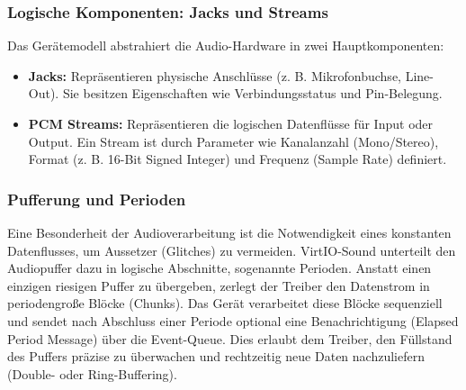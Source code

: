 \subsubsection{Logische Komponenten: Jacks und Streams}

Das Gerätemodell abstrahiert die Audio-Hardware in zwei Hauptkomponenten:

\begin{itemize}
 \item \textbf{Jacks:} Repräsentieren physische Anschlüsse (z. B. Mikrofonbuchse, Line-Out). Sie besitzen Eigenschaften wie Verbindungsstatus und Pin-Belegung.
 \item \textbf{PCM Streams:} Repräsentieren die logischen Datenflüsse für Input oder Output. Ein Stream ist durch Parameter wie Kanalanzahl (Mono/Stereo), Format (z. B. 16-Bit Signed Integer) und Frequenz (Sample Rate) definiert.
\end{itemize}

\subsubsection{Pufferung und Perioden}

Eine Besonderheit der Audioverarbeitung ist die Notwendigkeit eines konstanten Datenflusses, um Aussetzer (Glitches) zu vermeiden. VirtIO-Sound unterteilt den Audiopuffer dazu in logische Abschnitte, sogenannte Perioden. Anstatt einen einzigen riesigen Puffer zu übergeben, zerlegt der Treiber den Datenstrom in periodengroße Blöcke (Chunks). Das Gerät verarbeitet diese Blöcke sequenziell und sendet nach Abschluss einer Periode optional eine Benachrichtigung (Elapsed Period Message) über die Event-Queue. Dies erlaubt dem Treiber, den Füllstand des Puffers präzise zu überwachen und rechtzeitig neue Daten nachzuliefern (Double- oder Ring-Buffering).
